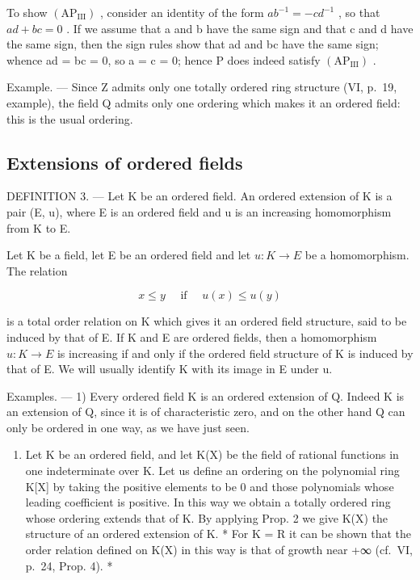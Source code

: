 To show \((\mathrm{AP}_{\mathrm{III}})\) , consider an identity of the form \(ab^{-1} = -cd^{-1}\) , so that \(ad + bc = 0\) . If we assume that a and b have the same sign and that c and d have the same sign, then the sign rules show that ad and bc have the same sign; whence ad = bc = 0, so a = c = 0; hence P does indeed satisfy \((\mathrm{AP}_{\mathrm{III}})\) .

Example. --- Since Z admits only one totally ordered ring structure (VI, p.~19, example), the field Q admits only one ordering which makes it an ordered field: this is the usual ordering.

\subsection{Extensions of ordered fields}

DEFINITION 3. --- Let K be an ordered field. An ordered extension of K is a pair (E, u), where E is an ordered field and u is an increasing homomorphism from K to E.

Let K be a field, let E be an ordered field and let \(u: K \rightarrow E\) be a homomorphism. The relation

\[
x \leqslant y \quad \text { if } \quad u (x) \leqslant u (y)
\]

is a total order relation on K which gives it an ordered field structure, said to be induced by that of E. If K and E are ordered fields, then a homomorphism \(u: K \rightarrow E\) is increasing if and only if the ordered field structure of K is induced by that of E. We will usually identify K with its image in E under u.

Examples. --- 1) Every ordered field K is an ordered extension of Q. Indeed K is an extension of Q, since it is of characteristic zero, and on the other hand Q can only be ordered in one way, as we have just seen.

\begin{enumerate}
\def\labelenumi{\arabic{enumi})}
\setcounter{enumi}{1}
\tightlist
\item
  Let K be an ordered field, and let K(X) be the field of rational functions in one indeterminate over K. Let us define an ordering on the polynomial ring K{[}X{]} by taking the positive elements to be 0 and those polynomials whose leading coefficient is positive. In this way we obtain a totally ordered ring whose ordering extends that of K. By applying Prop. 2 we give K(X) the structure of an ordered extension of K. * For K = R it can be shown that the order relation defined on K(X) in this way is that of growth near +∞ (cf.~VI, p.~24, Prop. 4). *
\end{enumerate}

